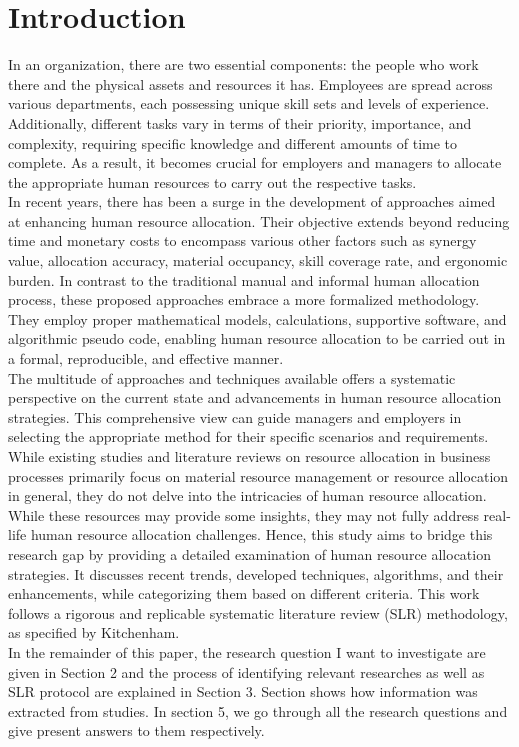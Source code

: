 \documentclass[runningheads]{llncs}
\begin{document}
\section{Introduction}
In an organization, there are two essential components: the people who work there and the physical assets and resources it has. Employees are spread across various departments, each possessing unique skill sets and levels of experience. Additionally, different tasks vary in terms of their priority, importance, and complexity, requiring specific knowledge and different amounts of time to complete. As a result, it becomes crucial for employers and managers to allocate the appropriate human resources to carry out the respective tasks.
\\
In recent years, there has been a surge in the development of approaches aimed at enhancing human resource allocation. Their objective extends beyond reducing time and monetary costs to encompass various other factors such as synergy value, allocation accuracy, material occupancy, skill coverage rate, and ergonomic burden. In contrast to the traditional manual and informal human allocation process, these proposed approaches embrace a more formalized methodology. They employ proper mathematical models, calculations, supportive software, and algorithmic pseudo code, enabling human resource allocation to be carried out in a formal, reproducible, and effective manner.
\\
The multitude of approaches and techniques available offers a systematic perspective on the current state and advancements in human resource allocation strategies. This comprehensive view can guide managers and employers in selecting the appropriate method for their specific scenarios and requirements. While existing studies and literature reviews on resource allocation in business processes primarily focus on material resource management or resource allocation in general, they do not delve into the intricacies of human resource allocation. While these resources may provide some insights, they may not fully address real-life human resource allocation challenges. Hence, this study aims to bridge this research gap by providing a detailed examination of human resource allocation strategies. It discusses recent trends, developed techniques, algorithms, and their enhancements, while categorizing them based on different criteria. This work follows a rigorous and replicable systematic literature review (SLR) methodology, as specified by Kitchenham.
\\
In the remainder of this paper, the research question I want to investigate are given in Section 2 and the process of identifying relevant researches as well as SLR protocol are explained in Section 3. Section shows how information was extracted from studies. In section 5, we go through all the research questions and give present answers to them respectively.
\end{document}
